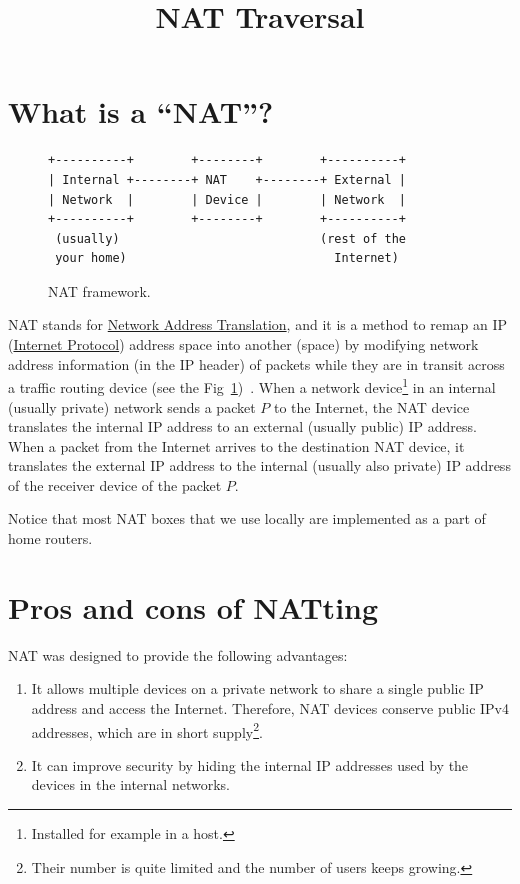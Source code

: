 
\title{NAT Traversal}

\maketitle
\tableofcontents

\section{What is a ``NAT''?}

\begin{figure}
\begin{verbatim}
+----------+        +--------+        +----------+
| Internal +--------+ NAT    +--------+ External |
| Network  |        | Device |        | Network  |
+----------+        +--------+        +----------+
 (usually)                            (rest of the
 your home)                             Internet)
\end{verbatim}
\caption{NAT framework.}
\label{fig:NAT_framework}
\end{figure}


NAT stands for
\href{https://en.wikipedia.org/wiki/Network_address_translation}{Network
  Address Translation}, and it is a method to remap an IP
(\href{https://en.wikipedia.org/wiki/Internet_Protocol}{Internet
  Protocol}) address space into another (space) by modifying network
address information (in the IP header) of packets while they are in
transit across a traffic routing device (see the
Fig~\ref{fig:NAT_framework})~\cite{srisuresh1999nat,Srisuresh2001}. When
a network device\footnote{Installed for example in a host.} in an
internal (usually private) network sends a packet $P$ to the Internet,
the NAT device translates the internal IP address to an external
(usually public) IP address. When a packet from the Internet arrives
to the destination NAT device, it translates the external IP address
to the internal (usually also private) IP address of the receiver
device of the packet $P$.

Notice that most NAT boxes that we use locally are implemented as a
part of home routers.

\section{Pros and cons of NATting}

NAT was designed to provide the following advantages:
\begin{enumerate}
\item It allows multiple devices on a private network to share a
  single public IP address and access the Internet. Therefore, NAT
  devices conserve public IPv4 addresses, which are in short
  supply\footnote{Their number is quite limited and the number of
  users keeps growing.}.
\item It can improve security by hiding the internal IP addresses used by the
  devices in the internal networks.
\end{enumerate}

